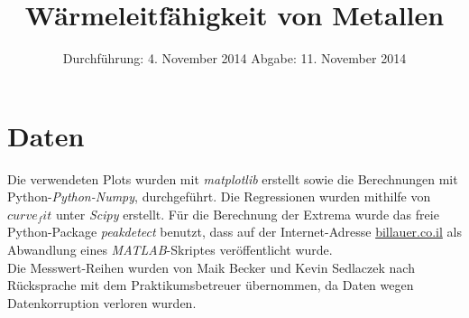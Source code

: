 
\usepackage{longtable}

\subject{Versuch 204}
\title{Wärmeleitfähigkeit von Metallen}

\date{
  Durchführung: 4. November 2014
  \hspace{1em}
  Abgabe: 11. November 2014
}


\maketitle
\thispagestyle{empty}
\newpage





\newpage
\section{Daten}
%
%
%

\nocite{V204}
\printbibliography
\noindent Die verwendeten Plots wurden mit \textit{matplotlib}\cite{matplotlib} erstellt sowie die Berechnungen mit Python-\textit{Python-Numpy}, \cite{numpy} durchgeführt.
Die Regressionen wurden mithilfe von \textit{$curve_fit$} unter \textit{Scipy}\cite{scipy} erstellt.
Für die Berechnung der Extrema wurde das freie Python-Package \textit{peakdetect} benutzt, dass auf der Internet-Adresse \href{http://billauer.co.il/peakdet.html}{billauer.co.il} als Abwandlung eines \textit{MATLAB}-Skriptes veröffentlicht wurde.\\

Die Messwert-Reihen wurden von Maik Becker und Kevin Sedlaczek nach Rücksprache mit dem Praktikumsbetreuer übernommen, da Daten wegen Datenkorruption verloren wurden.




